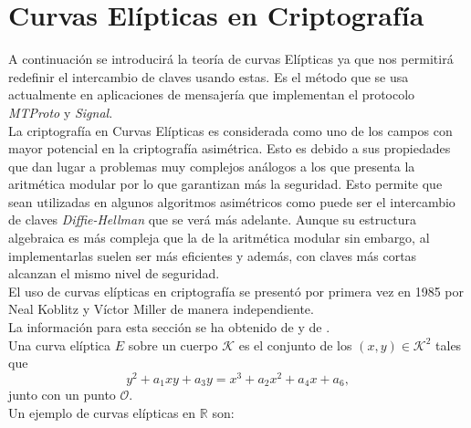 \section{Curvas Elípticas en Criptografía}
A continuación se introducirá la teoría de curvas Elípticas ya que nos permitirá redefinir el intercambio de claves usando estas. Es el método que se usa actualmente en aplicaciones de mensajería que implementan el protocolo \emph{MTProto} y \emph{Signal}.\\
La criptografía en Curvas Elípticas es considerada como uno de los campos con mayor potencial en la criptografía asimétrica.
Esto es debido a sus propiedades que dan lugar a problemas muy complejos análogos a los que presenta la aritmética modular por lo que garantizan más la seguridad. 
Esto permite que sean utilizadas en algunos algoritmos asimétricos como puede ser el intercambio de claves \emph{Diffie-Hellman} que se verá más adelante. 
Aunque su estructura algebraica es más compleja que la de la aritmética modular sin embargo, al implementarlas suelen ser más eficientes y además, con claves más cortas alcanzan 
el mismo nivel de seguridad.\\
El uso de curvas elípticas en criptografía se presentó por primera vez en 1985 por Neal Koblitz y Víctor Miller de manera independiente.\\
La información para esta sección se ha obtenido de \cite{En2011} y de \cite{apuntesCriptografia}.\\

Una curva elíptica $E$ sobre un cuerpo $\mathcal{K}$ es el conjunto de los $(x,y)\in \mathcal{K}^2$ tales que
$$
	y^2+a_1xy+a_3y = x^3+a_2x^2+a_4x+a_6,
$$
junto con un punto $\mathcal{O}$.\\
Un ejemplo de curvas elípticas en $\mathbb{R}$ son:
\begin{figure}[htb]
	\centering
	\qquad
\end{figure}

